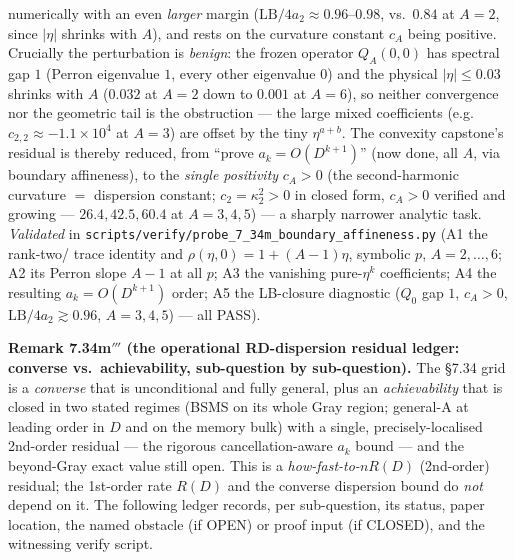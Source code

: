 \documentclass[
]{article}
\begin{document}
numerically with an even \emph{larger} margin ($\mathrm{LB}/4a_2\approx0.96$--$0.98$,
vs.\ $0.84$ at $A=2$, since $|\eta|$ shrinks with $A$), and rests on the curvature
constant $c_A$ being positive. Crucially the perturbation is \emph{benign}: the
frozen operator $Q_A(0,0)$ has spectral gap $1$ (Perron eigenvalue $1$, every other
eigenvalue $0$) and the physical $|\eta|\le0.03$ shrinks with $A$ ($0.032$ at $A=2$
down to $0.001$ at $A=6$), so neither convergence nor the geometric tail is the
obstruction --- the large mixed coefficients (e.g.\ $c_{2,2}\approx-1.1\times10^4$
at $A=3$) are offset by the tiny $\eta^{a+b}$. The convexity capstone's residual is
thereby reduced, from ``prove $a_k=O(D^{k+1})$'' (now done, all $A$, via boundary
affineness), to the \emph{single positivity} $c_A>0$ (the second-harmonic curvature
$=$ dispersion constant; $c_2=\kappa_2^2>0$ in closed form, $c_A>0$ verified and
growing --- $26.4,42.5,60.4$ at $A=3,4,5$) --- a sharply narrower analytic task.
\emph{Validated} in
\texttt{scripts/verify/probe\_7\_34m\_boundary\_affineness.py} (A1 the rank-two/
trace identity and $\rho(\eta,0)=1+(A-1)\eta$, symbolic $p$, $A=2,\dots,6$; A2 its
Perron slope $A{-}1$ at all $p$; A3 the vanishing pure-$\eta^k$ coefficients; A4
the resulting $a_k=O(D^{k+1})$ order; A5 the LB-closure diagnostic ($Q_0$ gap $1$,
$c_A>0$, $\mathrm{LB}/4a_2\gtrsim0.96$, $A=3,4,5$) --- all PASS).

\textbf{Remark 7.34m$'''$ (the operational RD-dispersion residual ledger:
converse vs.\ achievability, sub-question by sub-question).} The §7.34 grid is a
\emph{converse} that is unconditional and fully general, plus an
\emph{achievability} that is closed in two stated regimes (BSMS on its whole
Gray region; general-A at leading order in $D$ and on the memory bulk) with a
single, precisely-localised 2nd-order residual --- the rigorous
cancellation-aware $a_k$ bound --- and the beyond-Gray exact value still open.
This is a \emph{how-fast-to-$nR(D)$} (2nd-order) residual; the 1st-order rate
$R(D)$ and the converse dispersion bound do \emph{not} depend on it. The
following ledger records, per sub-question, its status, paper location, the
named obstacle (if OPEN) or proof input (if CLOSED), and the witnessing verify
script.
\end{document}
